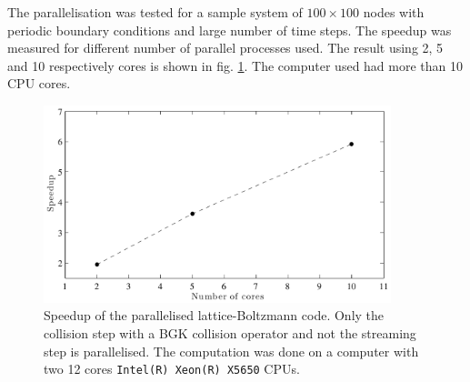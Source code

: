 The parallelisation was tested for a sample system of $100 \times 100$
nodes with periodic boundary conditions and large number of time
steps. The speedup was measured for different number of parallel
processes used. The result using 2, 5 and 10 respectively cores is
shown in fig. \ref{fig:hpc:para}. The computer used had more than 10
CPU cores. 

\begin{figure}
\begin{center}
\includegraphics[width=0.9\textwidth]{fig/para.pdf}
\end{center}
\caption[Speedup of the parallelised lattice-Boltzmann code.]{Speedup
    of the parallelised lattice-Boltzmann code. Only the collision
    step with a BGK collision operator and not the streaming step is
    parallelised. The computation was done on a computer with two 12
    cores \texttt{Intel(R) Xeon(R) X5650} CPUs.}
\label{fig:hpc:para}
\end{figure}


